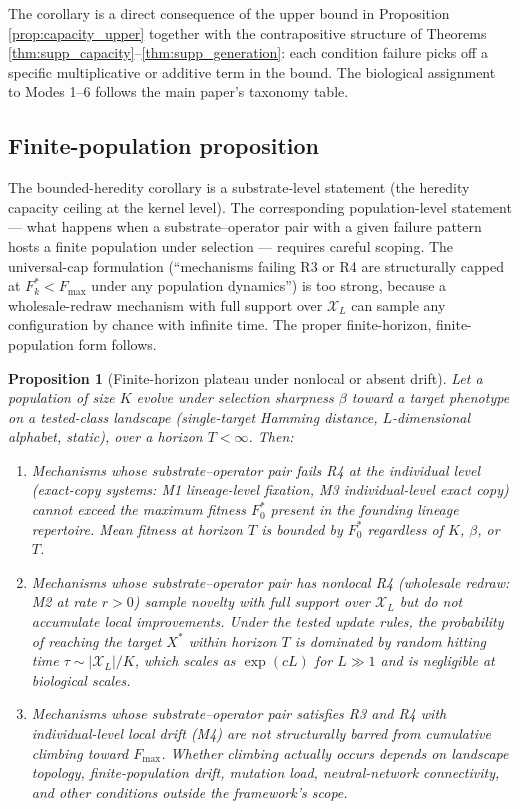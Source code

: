 \documentclass[11pt]{article}
\theoremstyle{plain}
\newtheorem{proposition}[theorem]{Proposition}
\theoremstyle{definition}
\newcommand{\Xset}{\mathcal{X}}
\begin{document}
The corollary is a direct consequence of the upper bound in Proposition \ref{prop:capacity_upper} together with the contrapositive structure of Theorems \ref{thm:supp_capacity}--\ref{thm:supp_generation}: each condition failure picks off a specific multiplicative or additive term in the bound. The biological assignment to Modes 1--6 follows the main paper's taxonomy table.

\subsection{Finite-population proposition}
\label{subsec:plateau}

The bounded-heredity corollary is a substrate-level statement (the heredity capacity ceiling at the kernel level). The corresponding population-level statement --- what happens when a substrate--operator pair with a given failure pattern hosts a finite population under selection --- requires careful scoping. The universal-cap formulation (``mechanisms failing R3 or R4 are structurally capped at $F^*_k < F_{\max}$ under any population dynamics'') is too strong, because a wholesale-redraw mechanism with full support over $\Xset_L$ can sample any configuration by chance with infinite time. The proper finite-horizon, finite-population form follows.

\begin{proposition}[Finite-horizon plateau under nonlocal or absent drift]
\label{prop:supp_plateau}
Let a population of size $K$ evolve under selection sharpness $\beta$ toward a target phenotype on a tested-class landscape (single-target Hamming distance, $L$-dimensional alphabet, static), over a horizon $T < \infty$. Then:

\begin{enumerate}
\item Mechanisms whose substrate--operator pair fails R4 at the individual level (exact-copy systems: M1 lineage-level fixation, M3 individual-level exact copy) cannot exceed the maximum fitness $F_0^*$ present in the founding lineage repertoire. Mean fitness at horizon $T$ is bounded by $F_0^*$ regardless of $K$, $\beta$, or $T$.

\item Mechanisms whose substrate--operator pair has nonlocal R4 (wholesale redraw: M2 at rate $r > 0$) sample novelty with full support over $\Xset_L$ but do not accumulate local improvements. Under the tested update rules, the probability of reaching the target $X^*$ within horizon $T$ is dominated by random hitting time $\tau \sim |\Xset_L| / K$, which scales as $\exp(c L)$ for $L \gg 1$ and is negligible at biological scales.

\item Mechanisms whose substrate--operator pair satisfies R3 and R4 with individual-level local drift (M4) are not structurally barred from cumulative climbing toward $F_{\max}$. Whether climbing actually occurs depends on landscape topology, finite-population drift, mutation load, neutral-network connectivity, and other conditions outside the framework's scope.
\end{enumerate}
\end{proposition}
\end{document}
